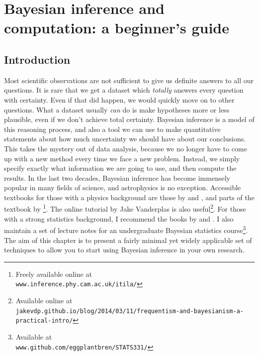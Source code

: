 \newcommand{\btheta}{\theta}
\newcommand{\data}{D}
\newcommand{\documentname}{chapter}

\author[Brendon J. Brewer]{Brendon J. Brewer\\
Department of Statistics, The University of Auckland}

\chapter{Bayesian inference and computation: a beginner's guide}

\section{Introduction}
Most scientific observations are not sufficient to give us definite answers
to all our questions. It is rare that we get a dataset which {\it totally}
answers every question with certainty. Even if that did happen, we would
quickly move on to other questions.
What a dataset usually {\it can} do is make hypotheses more or less plausible,
even if we don't achieve total certainty.
Bayesian inference is a model of this
reasoning process, and also a tool we can use
to make quantitative statements about how much
uncertainty we should have about our conclusions. This takes the mystery out
of data analysis, because we no longer have to come up with a new method
every time we face a new problem. Instead, we simply specify exactly what
information we are going to use, and then compute the results.
In the last two decades, Bayesian inference has become immensely popular in
many fields of science, and astrophysics is no exception. Accessible textbooks
for those with a physics background are those by \citet{gregory} and
\citet{sivia}, and parts of the textbook by \citet{mackay}\footnote{Freely
available online at\\
{\tt www.inference.phy.cam.ac.uk/itila/}}.
The online tutorial
by Jake Vanderplas is also useful\footnote{Available online at\\
{\tt jakevdp.github.io/blog/2014/03/11/frequentism-and-bayesianism-a-practical-intro/}}. For those with a strong statistics background,
I recommend the books by \citet{ohagan} and \citet{gelman}. I also maintain
a set of lecture notes for an undergraduate Bayesian statistics
course\footnote{Available at\\
{\tt www.github.com/eggplantbren/STATS331/}}.
The aim of this chapter is to present a fairly minimal yet widely applicable set of techniques to
allow you to start using Bayesian inference in your own research.


